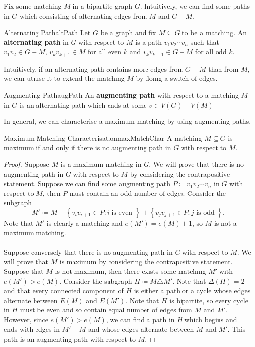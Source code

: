 \documentclass[math, code]{amznotes}
\theoremstyle{remark}
\begin{document}
Fix some matching $M$ in a bipartite graph $G$. Intuitively, we can find some paths in $G$ which consisting of alternating edges from $M$ and $G - M$.
\begin{dfnbox}{Alternating Path}{altPath}
    Let $G$ be a graph and fix $M \subseteq G$ to be a matching. An {\color{red} \textbf{alternating path}} in $G$ with respect to $M$ is a path $v_1v_2\cdots v_n$ such that $v_1v_2 \in G - M$, $v_kv_{k + 1} \in M$ for all even $k$ and $v_kv_{k + 1} \in G - M$ for all odd $k$.
\end{dfnbox}
Intuitively, if an alternating path contains more edges from $G - M$ than from $M$, we can utilise it to extend the matching $M$ by doing a switch of edges.
\begin{dfnbox}{Augmenting Path}{augPath}
    An {\color{red} \textbf{augmenting path}} with respect to a matching $M$ in $G$ is an alternating path which ends at some $v \in V(G) - V(M)$
\end{dfnbox}
In general, we can characterise a maximum matching by using augmenting paths.
\begin{thmbox}{Maximum Matching Characterisation}{maxMatchChar}
    A matching $M \subseteq G$ is maximum if and only if there is no augmenting path in $G$ with respect to $M$.
    \tcblower
    \begin{proof}
        Suppose $M$ is a maximum matching in $G$. We will prove that there is no augmenting path in $G$ with respect to $M$ by considering the contrapositive statement. Suppose we can find some augmenting path $P \coloneqq v_1v_2\cdots v_n$ in $G$ with respect to $M$, then $P$ must contain an odd number of edges. Consider the subgraph
        \begin{equation*}
            M' \coloneqq M - \left\{v_iv_{i + 1} \in P \colon i \textrm{ is even }\right\} + \left\{v_jv_{j + 1} \in P 
            \colon j \textrm{ is odd }\right\}.
        \end{equation*}
        Note that $M'$ is clearly a matching and $e(M') = e(M) + 1$, so $M$ is not a maximum matching.
        \\\\
        Suppose conversely that there is no augmenting path in $G$ with respect to $M$. We will prove that $M$ is maximum by considering the contrapositive statement. Suppose that $M$ is not maximum, then there exists some matching $M'$ with $e(M') > e(M)$. Consider the subgraph $H \coloneqq M \triangle M'$. Note that $\Delta(H) = 2$ and that every connected component of $H$ is either a path or a cycle whose edges alternate between $E(M)$ and $E(M')$. Note that $H$ is bipartite, so every cycle in $H$ must be even and so contain equal number of edges from $M$ and $M'$. However, since $e(M') > e(M)$, we can find a path in $H$ which begins and ends with edges in $M' - M$ and whose edges alternate between $M$ and $M'$. This path is an augmenting path with respect to $M$.
    \end{proof}
\end{thmbox}
\end{document}
